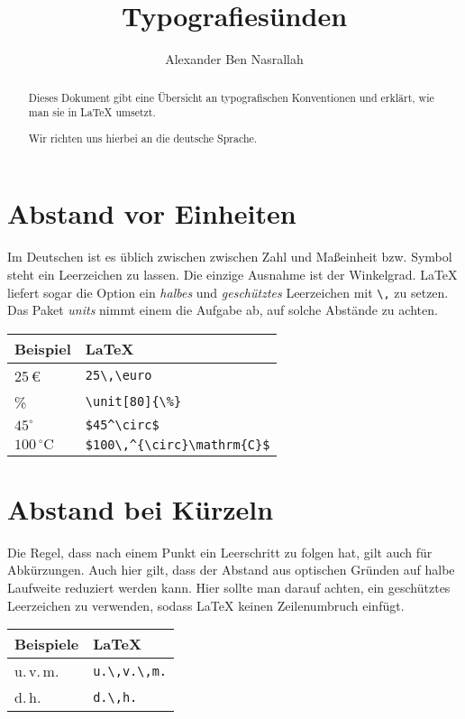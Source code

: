 \documentclass[a4paper]{article}
\title{Typografiesünden}
\author{Alexander Ben Nasrallah}
\begin{document}
\maketitle
\begin{abstract}
	Dieses Dokument gibt eine Übersicht an typografischen Konventionen und
	erklärt, wie man sie in \LaTeX{} umsetzt.

	Wir richten uns hierbei an die deutsche Sprache.
\end{abstract}

\tableofcontents

\section{Abstand vor Einheiten}
Im Deutschen ist es üblich zwischen zwischen
Zahl und Ma\ss{}einheit bzw. Symbol steht ein Leerzeichen zu lassen. Die
einzige Ausnahme ist der Winkelgrad. \LaTeX{} liefert sogar die Option
ein \emph{halbes} und \emph{geschütztes} Leerzeichen mit \verb+\,+ zu
setzen. Das Paket \emph{units} nimmt einem die Aufgabe ab, auf solche
Abstände zu achten.

\begin{tabular}[c]{|ll|}
	\hline
	\bf{Beispiel}             & \bf{\LaTeX}                       \\
	\hline
	25\,\euro                 & \verb+25\,\euro+                  \\
	\unit[80]{\%}             & \verb+\unit[80]{\%}+              \\
	$45^\circ$                & \verb+$45^\circ$+                 \\
	$100\,^{\circ}\mathrm{C}$ & \verb+$100\,^{\circ}\mathrm{C}$+ \\
	\hline
\end{tabular}

\section{Abstand bei Kürzeln}
Die Regel, dass nach einem Punkt ein
Leerschritt zu folgen hat, gilt auch für Abkürzungen. Auch hier gilt,
dass der Abstand aus optischen Gründen auf halbe Laufweite reduziert
werden kann. Hier sollte man darauf achten, ein geschütztes
Leerzeichen zu verwenden, sodass \LaTeX{} keinen Zeilenumbruch
einfügt.

\begin{tabular}[c]{|ll|}
	\hline
	\bf{Beispiele} & \bf{\LaTeX}       \\
	\hline
	u.\,v.\,m.     & \verb+u.\,v.\,m.+ \\
	d.\,h.         & \verb+d.\,h.+     \\
	\hline
\end{tabular}
\end{document}
